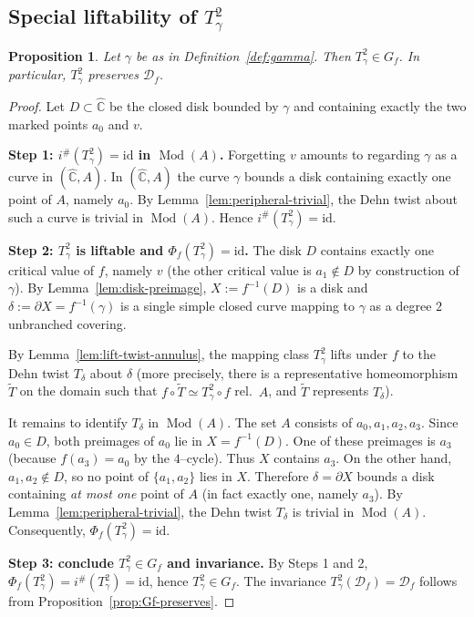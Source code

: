 \documentclass[11pt]{article}
\newtheorem{proposition}[theorem]{Proposition}
\DeclareMathOperator{\Mod}{Mod}
\begin{document}
\subsection{Special liftability of $T_\gamma^2$}
\begin{proposition}\label{prop:TwistSpecialLiftable}
Let $\gamma$ be as in Definition~\ref{def:gamma}. Then $T_\gamma^2\in G_f$. In particular, $T_\gamma^2$ preserves $\mathcal D_f$.
\end{proposition}

\begin{proof}
Let $D\subset \widehat{\mathbb C}$ be the closed disk bounded by $\gamma$ and containing exactly the two marked points $a_0$ and $v$.

\medskip
\noindent\textbf{Step 1: $i^\#(T_\gamma^2)=\mathrm{id}$ in $\Mod(A)$.}
Forgetting $v$ amounts to regarding $\gamma$ as a curve in $(\widehat{\mathbb C},A)$. In $(\widehat{\mathbb C},A)$ the curve $\gamma$ bounds a disk containing exactly one point of $A$, namely $a_0$. By Lemma~\ref{lem:peripheral-trivial}, the Dehn twist about such a curve is trivial in $\Mod(A)$. Hence $i^\#(T_\gamma^2)=\mathrm{id}$.

\medskip
\noindent\textbf{Step 2: $T_\gamma^2$ is liftable and $\Phi_f(T_\gamma^2)=\mathrm{id}$.}
The disk $D$ contains exactly one critical value of $f$, namely $v$ (the other critical value is $a_1\notin D$ by construction of $\gamma$). By Lemma~\ref{lem:disk-preimage}, $X:=f^{-1}(D)$ is a disk and $\delta:=\partial X=f^{-1}(\gamma)$ is a single simple closed curve mapping to $\gamma$ as a degree $2$ unbranched covering.

By Lemma~\ref{lem:lift-twist-annulus}, the mapping class $T_\gamma^{2}$ lifts under $f$ to the Dehn twist $T_\delta$ about $\delta$ (more precisely, there is a representative homeomorphism $\widetilde T$ on the domain such that $f\circ \widetilde T\simeq T_\gamma^2\circ f$ rel.\ $A$, and $\widetilde T$ represents $T_\delta$).

It remains to identify $T_\delta$ in $\Mod(A)$. The set $A$ consists of $a_0,a_1,a_2,a_3$. Since $a_0\in D$, both preimages of $a_0$ lie in $X=f^{-1}(D)$. One of these preimages is $a_3$ (because $f(a_3)=a_0$ by the $4$--cycle). Thus $X$ contains $a_3$. On the other hand, $a_1,a_2\notin D$, so no point of $\{a_1,a_2\}$ lies in $X$. Therefore $\delta=\partial X$ bounds a disk containing \emph{at most one} point of $A$ (in fact exactly one, namely $a_3$). By Lemma~\ref{lem:peripheral-trivial}, the Dehn twist $T_\delta$ is trivial in $\Mod(A)$. Consequently, $\Phi_f(T_\gamma^2)=\mathrm{id}$.

\medskip
\noindent\textbf{Step 3: conclude $T_\gamma^2\in G_f$ and invariance.}
By Steps 1 and 2, $\Phi_f(T_\gamma^2)=i^\#(T_\gamma^2)=\mathrm{id}$, hence $T_\gamma^2\in G_f$. The invariance $T_\gamma^2(\mathcal D_f)=\mathcal D_f$ follows from Proposition~\ref{prop:Gf-preserves}.
\end{proof}
\end{document}

